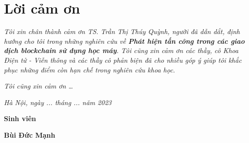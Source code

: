 \clearpage
{}

\chapter*{Lời cảm ơn}

\textit{Tôi xin chân thành cảm ơn TS. Trần Thị Thúy Quỳnh, người đã dẫn dắt, định hướng cho tôi trong những nghiên cứu về \textbf{Phát hiện tấn công trong các giao dịch blockchain sử dụng học máy}. Tôi cũng xin cảm ơn các thầy, cô Khoa Điện tử - Viễn thông và các thầy cô phản biện đã cho nhiều góp ý giúp tôi khắc phục những điểm còn hạn chế trong nghiên cứu khoa học.}

\textit{Tôi cũng xin cảm ơn \ldots}

\vspace{1cm}
\hspace{7cm}\textit{Hà Nội, ngày ... tháng ... năm 2023}

\hspace{9.4cm}\textbf{Sinh viên}
\vspace{2.5cm}


\hspace{9cm}\textbf{Bùi Đức Mạnh}

